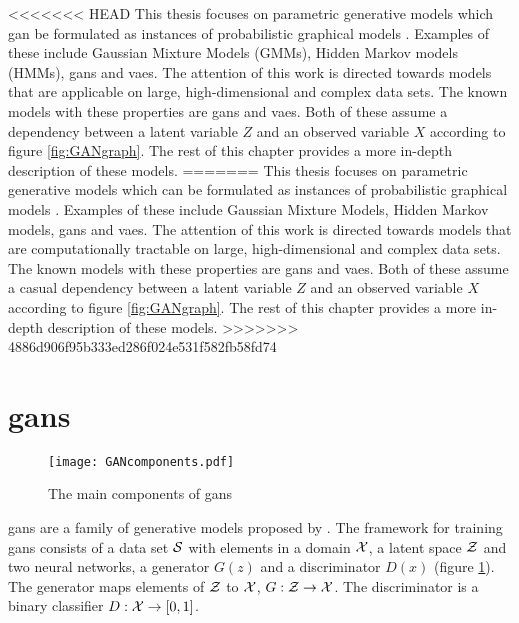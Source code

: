 <<<<<<< HEAD
This thesis focuses on parametric generative models which gan be formulated as instances of probabilistic graphical models \parencite{christopher2016pattern}. Examples of these include Gaussian Mixture Models (GMMs), Hidden Markov models (HMMs), \acrfull{gans} and \acrfull{vaes}. The attention of this work is directed towards models that are applicable on large, high-dimensional and complex data sets. The known models with these properties are  \acrshort{gans} and \acrshort{vaes}. Both of these assume a dependency between a latent variable $Z$ and an observed variable $X$ according to figure \ref{fig:GANgraph}. The rest of this chapter provides a more in-depth description of these models. 
=======
This thesis focuses on parametric generative models which can be formulated as instances of probabilistic graphical models \parencite{christopher2016pattern}. Examples of these include Gaussian Mixture Models, Hidden Markov models, \acrfull{gans} and \acrfull{vaes}. The attention of this work is directed towards models that are computationally tractable on large, high-dimensional and complex data sets. The known models with these properties are  \acrshort{gans} and \acrshort{vaes}. Both of these assume a casual dependency between a latent variable $Z$ and an observed variable $X$ according to figure \ref{fig:GANgraph}. The rest of this chapter provides a more in-depth description of these models. 
>>>>>>> 4886d906f95b333ed286f024e531f582fb58fd74


\section{\acrlong{gans}}

\begin{figure}
    \centering
    \texttt{[image: GANcomponents.pdf]}
    \caption{The main components of \acrshort{gans}}
    \label{fig:GAN}
\end{figure}

\acrfull{gans} are a family of generative models proposed by \textcite{goodfellow2014generative}. The framework for training \acrshort{gans} consists of a data set $\mathcal{S}$ with elements in a domain $\mathcal{X}$, a latent space $\mathcal{Z}$ and two neural networks, a generator $G(z)$ and a discriminator $D(x)$ (figure \ref{fig:GAN}). The generator maps elements of $\mathcal{Z}$ to $\mathcal{X}$, $G: \mathcal{Z} \rightarrow \mathcal{X}$. The discriminator is a binary classifier $D: \mathcal{X} \rightarrow [0, 1]$. 

